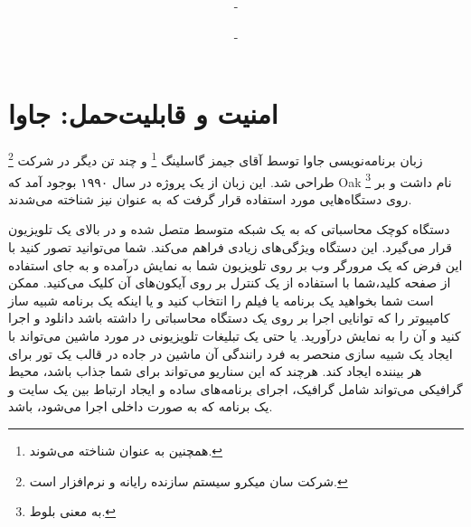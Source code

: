 \documentclass[a4paper,12pt]{report}
\begin{document}
	
	\renewcommand{\bibname}{مراجع}
	
	\title{
	}
	\author{
		-
	}
	\date{
		-
	}
	
	\maketitle
	\setcounter{page}{384}
	
	\setcounter{chapter}{12}
	\chapter{امنیت و قابلیت‌حمل: جاوا}\label{chap13}
	زبان برنامه‌نویسی جاوا
	 توسط آقای جیمز گاسلینگ 
	\footnote{
		همچنین به عنوان
		شناخته می‌شوند.}
	و چند تن دیگر در شرکت 
	\footnote{شرکت سان میکرو سیستم سازنده رایانه و نرم‌افزار است.}
	طراحی شد.
	این زبان از یک پروژه در سال ۱۹۹۰ بوجود آمد که 
	Oak \footnote{
	به معنی بلوط.}
	 نام داشت و بر روی دستگاه‌هایی مورد استفاده قرار گرفت که به عنوان 
	 نیز شناخته می‌شدند.
	 
	 دستگاه کوچک محاسباتی که به یک شبکه متوسط متصل شده و در بالای یک تلویزیون قرار می‌گیرد. این دستگاه ويژگی‌های زیادی فراهم می‌کند. شما می‌توانید تصور کنید با این فرض که یک مرورگر وب بر روی تلویزیون شما به نمایش درآمده و به جای استفاده از صفحه کلید،شما ‌با استفاده از یک کنترل بر روی آیکون‌های آن کلیک می‌کنید. 
	 ممکن است  شما بخواهید یک برنامه یا فیلم را انتخاب کنید و یا اینکه یک برنامه شبیه ساز کامپیوتر را که توانایی اجرا بر روی یک دستگاه محاسباتی را داشته باشد دانلود و اجرا کنید و آن را به نمایش درآورید. 
	 یا حتی یک تبلیغات تلویزیونی در مورد ماشین می‌تواند با ایجاد یک شبیه سازی منحصر   به فرد رانندگی آن ماشین در جاده در قالب یک تور برای هر بیننده ایجاد کند.
	 هرچند که این سناریو می‌تواند برای شما جذاب باشد، محیط گرافیکی می‌تواند شامل گرافیک، اجرای برنامه‌های ساده و ایجاد ارتباط بین یک سایت و یک برنامه که به صورت داخلی اجرا می‌شود، باشد.
	 
\end{document}
